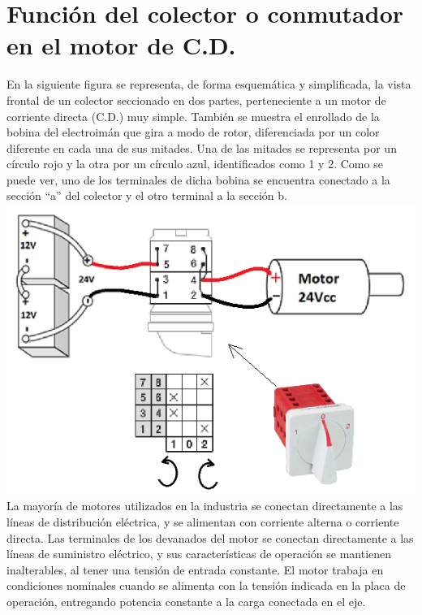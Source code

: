 \documentclass[12pt,a4paper]{article}
\begin{document}
\section{Funci\'on del colector o conmutador en el motor de C.D.
}
En la siguiente figura se representa, de forma esquemática y simplificada, la vista frontal de un colector seccionado en dos partes, perteneciente a un motor de corriente directa (C.D.) muy simple. Tambi\'en se muestra el enrollado de la bobina del electroim\'an que gira a modo de rotor, diferenciada por un color diferente en cada una de sus mitades. Una de las mitades se representa por un c\'irculo rojo y la otra por un c\'irculo azul, identificados como 1 y 2. Como se puede ver, uno de los terminales de dicha bobina se encuentra conectado a la secci\'on “a” del colector y el otro terminal a la secci\'on b.
\newpage 
\includegraphics[scale=1]{conexion motor cc2.png} \\
La mayor\'ia de motores utilizados en la industria se conectan directamente a las l\'ineas de distribuci\'on el\'ectrica, y se alimentan con corriente alterna o corriente directa. Las terminales de los devanados del motor se conectan directamente a las l\'ineas de suministro el\'ectrico, y sus caracter\'isticas de operaci\'on se mantienen inalterables, al tener una tensi\'on de entrada constante. El motor trabaja en condiciones nominales cuando se alimenta con la tensi\'on indicada en la placa de operaci\'on, entregando potencia constante a la carga conectada en el eje.
\end{document}
